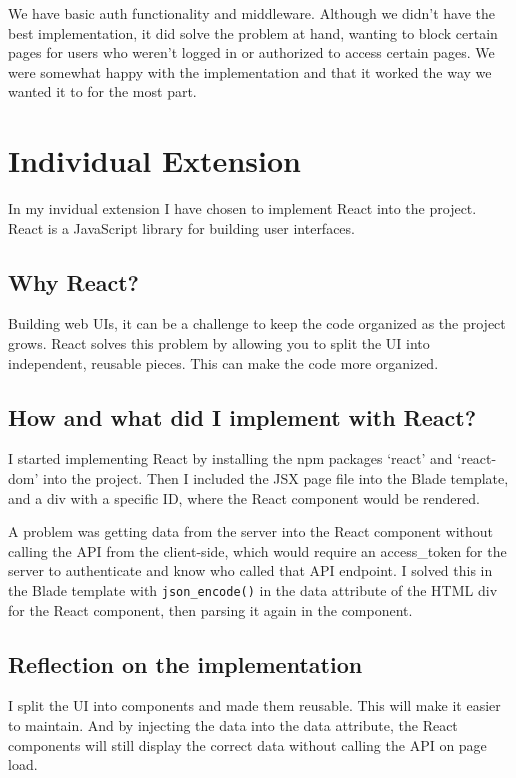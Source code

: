 \documentclass[letterpaper,twocolumn]{article}
\begin{document}
We have basic auth functionality and middleware.
Although we didn't have the best implementation, it did solve the problem at hand, wanting to block certain pages for users who weren't logged in or authorized to access certain pages.
We were somewhat happy with the implementation and that it worked the way we wanted it to for the most part.


\section{Individual Extension}

In my invidual extension I have chosen to implement React into the project.
React is a JavaScript library for building user interfaces.

\subsection{Why React?}

Building web UIs, it can be a challenge to keep the code organized as the project grows.
React solves this problem by allowing you to split the UI into independent, reusable pieces.
This can make the code more organized.

\subsection{How and what did I implement with React?}

I started implementing React by installing the npm packages `react' and `react-dom' into the project.
Then I included the JSX page file into the Blade template, and a div with a specific ID, where the React component would be rendered.

A problem was getting data from the server into the React component without calling the API from the client-side, which would require an access\_token for the server to authenticate and know who called that API endpoint.
I solved this in the Blade template with \texttt{json_encode()} in the data attribute of the HTML div for the React component, then parsing it again in the component.

\subsection{Reflection on the implementation}

I split the UI into components and made them reusable.
This will make it easier to maintain.
And by injecting the data into the data attribute,
the React components will still display the correct data without calling the API on page load.
\end{document}
